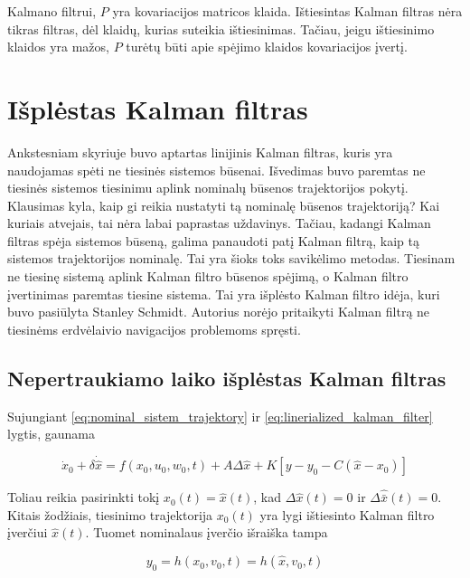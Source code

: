 \documentclass[12pt, a4paper, lithuanian]{article}
\begin{document}
        Kalmano filtrui, $P$ yra kovariacijos matricos klaida.
        Ištiesintas Kalman filtras nėra tikras filtras, dėl klaidų, kurias suteikia ištiesinimas.
        Tačiau, jeigu ištiesinimo klaidos yra mažos, $P$ turėtų būti apie spėjimo klaidos kovariacijos įvertį.


    \section{Išplėstas Kalman filtras}

        Ankstesniam skyriuje buvo aptartas linijinis Kalman filtras, kuris yra naudojamas spėti ne tiesinės sistemos būsenai.
        Išvedimas buvo paremtas ne tiesinės sistemos tiesinimu aplink nominalų būsenos trajektorijos pokytį.
        Klausimas kyla, kaip gi reikia nustatyti tą nominalę būsenos trajektoriją?
        Kai kuriais atvejais, tai nėra labai paprastas uždavinys.
        Tačiau, kadangi Kalman filtras spėja sistemos būseną, galima panaudoti patį Kalman filtrą, kaip tą sistemos trajektorijos nominalę.
        Tai yra šioks toks savikėlimo metodas.
        Tiesinam ne tiesinę sistemą aplink Kalman filtro būsenos spėjimą, o Kalman filtro įvertinimas paremtas tiesine sistema.
        Tai yra išplėsto Kalman filtro idėja, kuri buvo pasiūlyta Stanley Schmidt.
        Autorius norėjo pritaikyti Kalman filtrą ne tiesinėms erdvėlaivio navigacijos problemoms spręsti.

        \subsection{Nepertraukiamo laiko išplėstas Kalman filtras}

            Sujungiant \ref{eq:nominal_sistem_trajektory} ir \ref{eq:linerialized_kalman_filter} lygtis, gaunama

            \begin{equation}
                \dot{x}_0 + \delta \dot{\hat{x}} = f(x_0, u_0, w_0, t) + A \Delta \hat{x} + K[y-y_0 -C(\hat{x} - x_0)]
            \end{equation}

            Toliau reikia pasirinkti tokį $x_0(t)=\hat{x}(t)$, kad $\Delta\hat{x}(t) = 0$ ir $\Delta\hat{\bar{x}}(t) = 0$.
            Kitais žodžiais, tiesinimo trajektorija $x_0(t)$ yra lygi ištiesinto Kalman filtro įverčiui $\hat{x}(t)$.
            Tuomet nominalaus įverčio išraiška tampa

            \begin{equation}
                y_0 = h(x_0, v_0, t) = h(\hat{x}, v_0, t)
            \end{equation}
\end{document}
